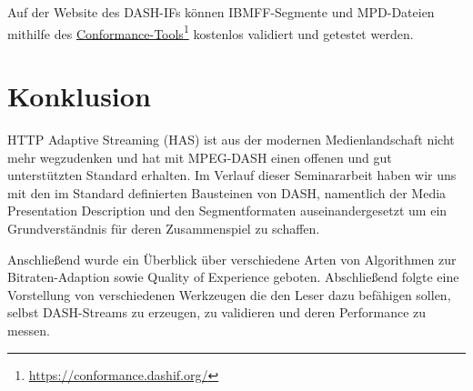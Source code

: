 \documentclass[paper = a4, fontsize = 12pt, parskip = half]{scrartcl} %
\begin{document}
Auf der Website des DASH-IFs können IBMFF-Segmente und MPD-Dateien mithilfe des \hyperref{https://conformance.dashif.org/}{}{}{Conformance-Tools}\footnote{\url{https://conformance.dashif.org/}} kostenlos validiert und getestet werden.

\section{Konklusion}
HTTP Adaptive Streaming (HAS) ist aus der modernen Medienlandschaft nicht mehr wegzudenken und hat mit MPEG-DASH einen offenen und gut unterstützten Standard erhalten. Im Verlauf dieser Seminararbeit haben wir uns mit den im Standard definierten Bausteinen von DASH, namentlich der Media Presentation Description und den Segmentformaten auseinandergesetzt um ein Grundverständnis für deren Zusammenspiel zu schaffen.

Anschließend wurde ein Überblick über verschiedene Arten von Algorithmen zur Bitraten-Adaption sowie Quality of Experience geboten. Abschließend folgte eine Vorstellung von verschiedenen Werkzeugen die den Leser dazu befähigen sollen, selbst DASH-Streams zu erzeugen, zu validieren und deren Performance zu messen.


\newpage
\printbibliography
\end{document}
